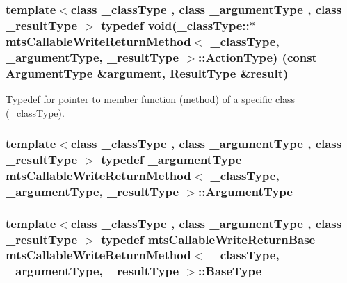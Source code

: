 \subsubsection[{Action\+Type}]{\setlength{\rightskip}{0pt plus 5cm}template$<$class \+\_\+class\+Type , class \+\_\+argument\+Type , class \+\_\+result\+Type $>$ typedef void(\+\_\+class\+Type\+::$\ast$ {\bf mts\+Callable\+Write\+Return\+Method}$<$ \+\_\+class\+Type, \+\_\+argument\+Type, \+\_\+result\+Type $>$\+::Action\+Type) (const {\bf Argument\+Type} \&argument, {\bf Result\+Type} \&result)}\label{classmts_callable_write_return_method_a650562eae4db20a5cfbbff0f9f7e1a0a}
Typedef for pointer to member function (method) of a specific class (\+\_\+class\+Type). \hypertarget{classmts_callable_write_return_method_a694e2620eacec8300718daa334cccd01}{}
\subsubsection[{Argument\+Type}]{\setlength{\rightskip}{0pt plus 5cm}template$<$class \+\_\+class\+Type , class \+\_\+argument\+Type , class \+\_\+result\+Type $>$ typedef \+\_\+argument\+Type {\bf mts\+Callable\+Write\+Return\+Method}$<$ \+\_\+class\+Type, \+\_\+argument\+Type, \+\_\+result\+Type $>$\+::{\bf Argument\+Type}}\label{classmts_callable_write_return_method_a694e2620eacec8300718daa334cccd01}
\hypertarget{classmts_callable_write_return_method_a324edde317d1c130c8f88c2f3ff71ed2}{}
\subsubsection[{Base\+Type}]{\setlength{\rightskip}{0pt plus 5cm}template$<$class \+\_\+class\+Type , class \+\_\+argument\+Type , class \+\_\+result\+Type $>$ typedef {\bf mts\+Callable\+Write\+Return\+Base} {\bf mts\+Callable\+Write\+Return\+Method}$<$ \+\_\+class\+Type, \+\_\+argument\+Type, \+\_\+result\+Type $>$\+::{\bf Base\+Type}}\label{classmts_callable_write_return_method_a324edde317d1c130c8f88c2f3ff71ed2}
\hypertarget{classmts_callable_write_return_method_a51dbe6298941ab172d83182c8188092d}{}
